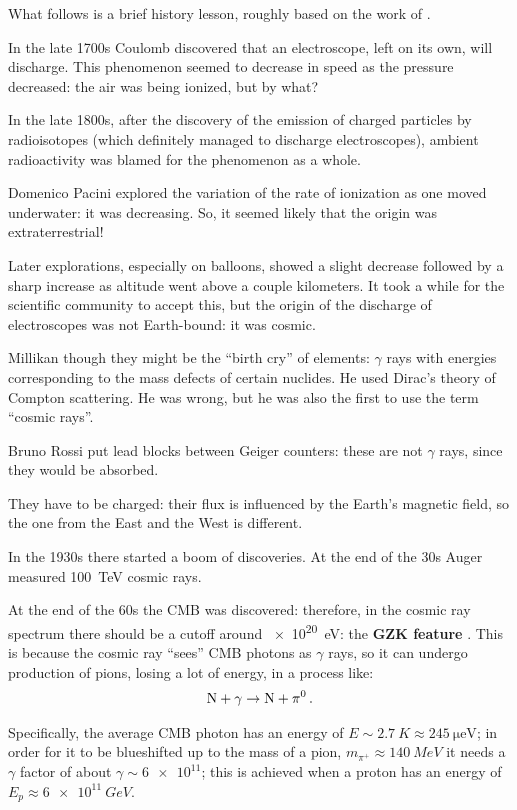 \documentclass[main.tex]{subfiles}
\begin{document}
What follows is a brief history lesson, roughly based on the work of \textcite[]{deangelisAtmosphericIonizationCosmic2014}.

In the late 1700s Coulomb discovered that an electroscope, left on its own, will discharge. 
This phenomenon seemed to decrease in speed as the pressure decreased: the air was being ionized, but by what?

In the late 1800s, after the discovery of the emission of charged particles by radioisotopes (which definitely managed to discharge electroscopes), ambient radioactivity was blamed for the phenomenon as a whole. 

Domenico Pacini explored the variation of the rate of ionization as one moved underwater: it was decreasing. 
So, it seemed likely that the origin was extraterrestrial! 

Later explorations, especially on balloons, showed a slight decrease followed by a sharp increase as altitude went above a couple kilometers.
It took a while for the scientific community to accept this, but the origin of the discharge of electroscopes was not Earth-bound: it was cosmic.
 
Millikan though they might be the ``birth cry'' of elements: \(\gamma \) rays with energies
corresponding to the mass defects of certain nuclides. 
He used Dirac's theory of Compton scattering. 
He was wrong, but he was also the first to use the term ``cosmic rays''.

Bruno Rossi put lead blocks between Geiger counters: these are not \(\gamma \) rays, since
they would be absorbed. 

They have to be charged: their flux is influenced by the Earth's magnetic field, so 
the one from the East and the West is different. 

In the 1930s there started a boom of discoveries. 
At the end of the 30s Auger measured \SI{100}{TeV} cosmic rays. 

At the end of the 60s the CMB was discovered: 
therefore, in the cosmic ray spectrum there should be a cutoff around \SI{e20}{eV}: the \textbf{GZK feature} \cite[sec.\ 5.1]{aloisioSelectedTopicsCosmic2018}. 
This is because the cosmic ray ``sees'' CMB photons as \(\gamma \) rays, so  
it can undergo production of pions, losing a lot of energy, in a process like: 
%
\begin{align}
\ce{N} + \gamma \to \ce{N} + \pi^{0}
\,.
\end{align}

Specifically, the average CMB photon has an energy of \(E \sim \SI{2.7}{K} \approx \SI{245}{\micro \eV}\); in order for it to be blueshifted up to the mass of a pion, \(m_{\pi^{+}} \approx \SI{140}{MeV}\) it needs a \(\gamma \) factor of about \(\gamma \sim \num{6e11}\); this is achieved when a proton has an energy of \(E_p \approx \SI{6e11}{GeV}\). 
\end{document}
